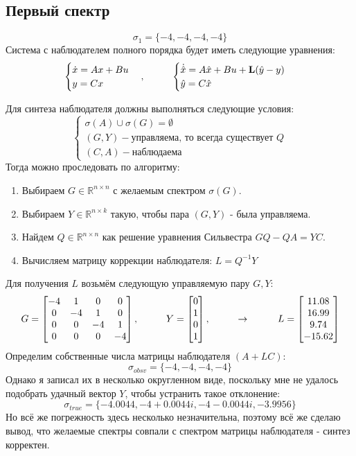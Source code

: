 \subsection{Первый спектр}
$$
  \sigma_1 = \{-4,-4,-4,-4\}
$$
Система с наблюдателем полного порядка будет иметь следующие уравнения:
$$
\begin{cases}
  \dot{x} = Ax + Bu \\
  y = Cx 
\end{cases}, \hspace*{1cm} 
\begin{cases}
  \dot{\hat{x}} = A\hat{x} + Bu +\mathbf{L}(\hat{y}-y)\\
  \hat{y} = C\hat{x} 
\end{cases}
$$

Для синтеза наблюдателя должны выполняться следующие условия:
$$
\begin{cases}
  \sigma(A)\cup\sigma(G)=\emptyset \\
  (G,Y) - \text{управляема, то всегда  существует } Q  \\
  (C,A) - \text{наблюдаема}
\end{cases}
$$
Тогда можно проследовать по алгоритму:
\begin{enumerate}
  \item Выбираем $G\in\mathbb{R}^{n\times n}$ с желаемым спектром $\sigma(G)$.
  \item Выбираем $Y\in\mathbb{R}^{n\times k}$ такую, чтобы пара $(G,Y)$ - была управляема.
  \item Найдем $Q\in\mathbb{R}^{n \times n}$ как решение уравнения Сильвестра $GQ - QA = YC$.
  \item Вычисляем матрицу коррекции наблюдателя: $L = Q^{-1}Y$
\end{enumerate}
Для получения $L$ возьмём следующую управляемую пару $G,Y$:
$$
G = \begin{bmatrix}
  -4  &   1  &   0  &   0 \\
  0  &  -4   &  1   &  0 \\
  0  &   0  &  -4  &   1 \\
  0   &  0   &  0  &  -4
\end{bmatrix}, \hspace*{1cm} Y = \begin{bmatrix} 0\\1\\0\\1 \end{bmatrix},\hspace*{1cm} \rightarrow \hspace*{1cm}
L = \begin{bmatrix}
      11.08\\16.99\\9.74\\-15.62
    \end{bmatrix}
$$
Определим собственные числа матрицы наблюдателя $(A+LC)$:
$$
    \sigma_{obsv}=\{-4, -4, -4, -4 \}
$$
Однако я записал их в несколько округленном виде, поскольку мне не удалось подобрать удачный вектор $Y$, чтобы устранить такое отклонение:
$$
    \sigma_{true}=\{-4.0044, -4 + 0.0044i, -4 - 0.0044i, -3.9956 \}
$$
Но всё же погрежность здесь несколько незначительна, поэтому всё же сделаю вывод, что желаемые спектры совпали с спектром матрицы наблюдателя - синтез корректен.

